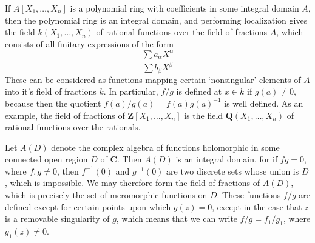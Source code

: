 \begin{example}
    If $A[X_1, \dots, X_n]$ is a polynomial ring with coefficients in some integral domain $A$, then the polynomial ring is an integral domain, and performing localization gives the field $k(X_1, \dots, X_n)$ of rational functions over the field of fractions $A$, which consists of all finitary expressions of the form
    \[ \frac{\sum a_\alpha X^\alpha}{\sum b_\beta X^\beta} \]
    These can be considered as functions mapping certain `nonsingular' elements of $A$ into it's field of fractions $k$. In particular, $f/g$ is defined at $x \in k$ if $g(a) \neq 0$, because then the quotient $f(a)/g(a) = f(a) g(a)^{-1}$ is well defined. As an example, the field of fractions of $\mathbf{Z}[X_1, \dots, X_n]$ is the field $\mathbf{Q}(X_1, \dots, X_n)$ of rational functions over the rationals.
\end{example}

\begin{example}
    Let $A(D)$ denote the complex algebra of functions holomorphic in some connected open region $D$ of $\mathbf{C}$. Then $A(D)$ is an integral domain, for if $fg = 0$, where $f,g \neq 0$, then $f^{-1}(0)$ and $g^{-1}(0)$ are two discrete sets whose union is $D$, which is impossible. We may therefore form the field of fractions of $A(D)$, which is precisely the set of meromorphic functions on $D$. These functions $f/g$ are defined except for certain points upon which $g(z) = 0$, except in the case that $z$ is a removable singularity of $g$, which means that we can write $f/g = f_1/g_1$, where $g_1(z) \neq 0$.
\end{example} 

